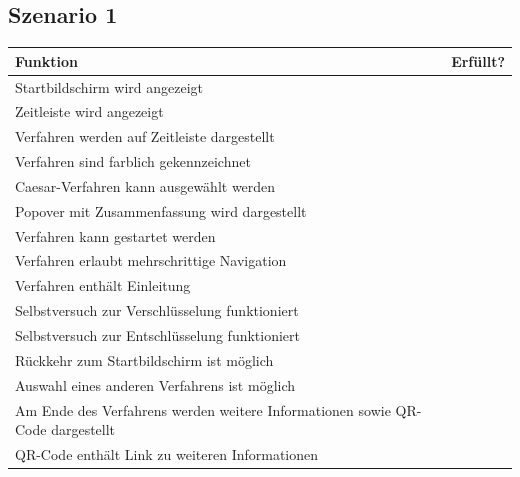 \documentclass{article}
\newcommand{\cmark}{\ding{51}}
\begin{document}
  \subsection{Szenario 1}
    \begin{table}[H]
      \begin{tabularx}{\textwidth}{| >{\raggedright\arraybackslash}X | c |}
        \hline
        \textbf{Funktion} & \textbf{Erfüllt?} \\
        \hline
        Startbildschirm wird angezeigt & \cmark \\
        \hline
        Zeitleiste wird angezeigt & \cmark \\
        \hline
        Verfahren werden auf Zeitleiste dargestellt & \cmark \\
        \hline
        Verfahren sind farblich gekennzeichnet & \cmark \\
        \hline
        Caesar-Verfahren kann ausgewählt werden & \cmark \\
        \hline
        Popover mit Zusammenfassung wird dargestellt & \cmark \\
        \hline
        Verfahren kann gestartet werden & \cmark \\
        \hline
        Verfahren erlaubt mehrschrittige Navigation & \cmark \\
        \hline
        Verfahren enthält Einleitung & \cmark \\
        \hline
        Selbstversuch zur Verschlüsselung funktioniert & \cmark \\
        \hline
        Selbstversuch zur Entschlüsselung funktioniert & \cmark \\
        \hline
        Rückkehr zum Startbildschirm ist möglich & \cmark \\
        \hline
        Auswahl eines anderen Verfahrens ist möglich & \cmark \\
        \hline
        Am Ende des Verfahrens werden weitere Informationen sowie QR-Code dargestellt & \cmark \\
        \hline
        QR-Code enthält Link zu weiteren Informationen & \cmark \\
        \hline
      \end{tabularx}
    \end{table}
\end{document}
